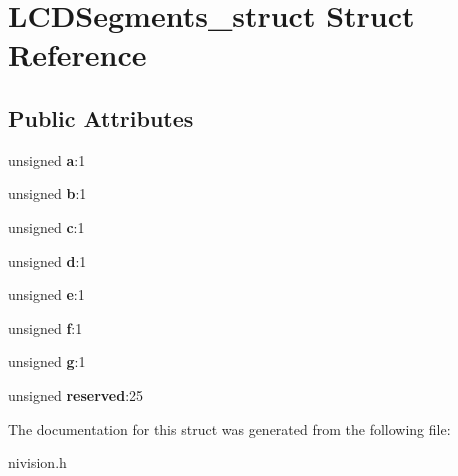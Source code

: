 \hypertarget{structLCDSegments__struct}{\section{\-L\-C\-D\-Segments\-\_\-struct \-Struct \-Reference}
\label{structLCDSegments__struct}
}
\subsection*{\-Public \-Attributes}
\begin{DoxyCompactItemize}
\item 
\hypertarget{structLCDSegments__struct_ad0992c4d20b0deedf72a5f6da9807442}{unsigned {\bfseries a}\-:1}\label{structLCDSegments__struct_ad0992c4d20b0deedf72a5f6da9807442}

\item 
\hypertarget{structLCDSegments__struct_a8e56fb087d3fc7a8b2dc9b3c5e47b1c4}{unsigned {\bfseries b}\-:1}\label{structLCDSegments__struct_a8e56fb087d3fc7a8b2dc9b3c5e47b1c4}

\item 
\hypertarget{structLCDSegments__struct_a4cb2e9b683f2dba54db8a9fea9284955}{unsigned {\bfseries c}\-:1}\label{structLCDSegments__struct_a4cb2e9b683f2dba54db8a9fea9284955}

\item 
\hypertarget{structLCDSegments__struct_acacc4a4b025fc4a2e6738ca80a283929}{unsigned {\bfseries d}\-:1}\label{structLCDSegments__struct_acacc4a4b025fc4a2e6738ca80a283929}

\item 
\hypertarget{structLCDSegments__struct_a8af46cabd3ee9c9242e42f79809b8e5e}{unsigned {\bfseries e}\-:1}\label{structLCDSegments__struct_a8af46cabd3ee9c9242e42f79809b8e5e}

\item 
\hypertarget{structLCDSegments__struct_a843b60988db8efa6c5fef4e986306d80}{unsigned {\bfseries f}\-:1}\label{structLCDSegments__struct_a843b60988db8efa6c5fef4e986306d80}

\item 
\hypertarget{structLCDSegments__struct_a21f91e9e7b539e470c7d4117efdd6579}{unsigned {\bfseries g}\-:1}\label{structLCDSegments__struct_a21f91e9e7b539e470c7d4117efdd6579}

\item 
\hypertarget{structLCDSegments__struct_aae144e3a95d1a95d16485c4112ccbbc5}{unsigned {\bfseries reserved}\-:25}\label{structLCDSegments__struct_aae144e3a95d1a95d16485c4112ccbbc5}

\end{DoxyCompactItemize}


\-The documentation for this struct was generated from the following file\-:\begin{DoxyCompactItemize}
\item 
nivision.\-h\end{DoxyCompactItemize}
